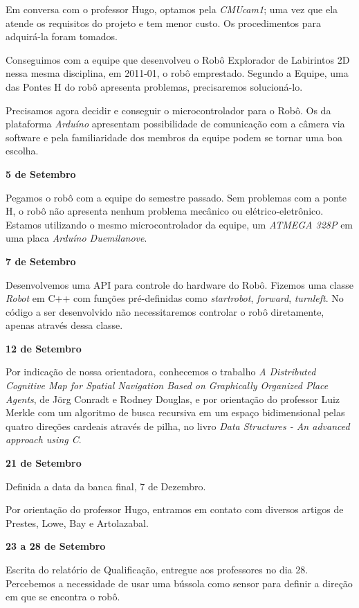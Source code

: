 Em conversa com o professor Hugo, optamos pela \textit{CMUcam1}; uma vez que ela atende os requisitos do projeto e tem menor custo. Os procedimentos para adquirá-la foram tomados.

Conseguimos com a equipe que desenvolveu o Robô Explorador de Labirintos 2D nessa mesma disciplina, em 2011-01, o robô emprestado. Segundo a Equipe, uma das Pontes H do robô apresenta problemas, precisaremos solucioná-lo. 

Precisamos agora decidir e conseguir o microcontrolador para o Robô. Os da plataforma \textit{Arduíno} apresentam possibilidade de comunicação com a câmera via software e pela familiaridade dos membros da equipe podem se tornar uma boa escolha.

\textbf{5 de Setembro}

Pegamos o robô com a equipe do semestre passado. Sem problemas com a ponte H, o robô não apresenta nenhum problema mecânico ou elétrico-eletrônico. Estamos utilizando o mesmo microcontrolador da equipe, um \textit{ATMEGA 328P} em  uma placa \textit{Arduíno Duemilanove}. 

\textbf{ 7 de Setembro}

Desenvolvemos uma API para controle do hardware do Robô. Fizemos uma classe \textit{Robot} em C++ com funções pré-definidas como \textit{startrobot}, \textit{forward}, \textit{turnleft}. No código a ser desenvolvido não necessitaremos controlar o robô diretamente, apenas através dessa classe.

\textbf{12 de Setembro}

Por indicação de nossa orientadora, conhecemos o trabalho \textit{A Distributed Cognitive Map for Spatial Navigation Based on Graphically Organized Place Agents}, de Jörg Conradt e Rodney Douglas, e por orientação do professor Luiz Merkle com um algoritmo de busca recursiva em um espaço bidimensional pelas quatro direções cardeais através de pilha, no livro \textit{Data Structures - An advanced approach using C}.

\textbf{21 de Setembro}

Definida a data da banca final, 7 de Dezembro. 

Por orientação do professor Hugo, entramos em contato com diversos artigos de Prestes, Lowe, Bay e Artolazabal.

\textbf{23 a 28 de Setembro}

Escrita do relatório de Qualificação, entregue aos professores no dia 28. Percebemos a necessidade de usar uma bússola como sensor para definir a direção em que se encontra o robô.

